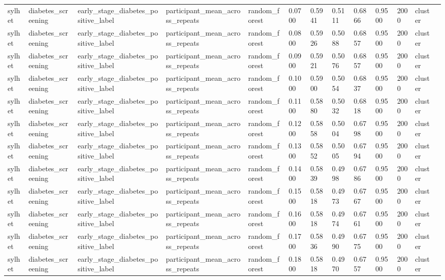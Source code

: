\begin{tabular}{lllllllllllll}
sylhet & diabetes\_screening & early\_stage\_diabetes\_positive\_label & participant\_mean\_across\_repeats & random\_forest & 0.0700 & 0.5941 & 0.5111 & 0.6866 & 0.9500 & 2000 & cluster &  \\
sylhet & diabetes\_screening & early\_stage\_diabetes\_positive\_label & participant\_mean\_across\_repeats & random\_forest & 0.0800 & 0.5926 & 0.5088 & 0.6857 & 0.9500 & 2000 & cluster &  \\
sylhet & diabetes\_screening & early\_stage\_diabetes\_positive\_label & participant\_mean\_across\_repeats & random\_forest & 0.0900 & 0.5921 & 0.5076 & 0.6857 & 0.9500 & 2000 & cluster &  \\
sylhet & diabetes\_screening & early\_stage\_diabetes\_positive\_label & participant\_mean\_across\_repeats & random\_forest & 0.1000 & 0.5900 & 0.5054 & 0.6837 & 0.9500 & 2000 & cluster &  \\
sylhet & diabetes\_screening & early\_stage\_diabetes\_positive\_label & participant\_mean\_across\_repeats & random\_forest & 0.1100 & 0.5880 & 0.5032 & 0.6818 & 0.9500 & 2000 & cluster &  \\
sylhet & diabetes\_screening & early\_stage\_diabetes\_positive\_label & participant\_mean\_across\_repeats & random\_forest & 0.1200 & 0.5858 & 0.5004 & 0.6798 & 0.9500 & 2000 & cluster &  \\
sylhet & diabetes\_screening & early\_stage\_diabetes\_positive\_label & participant\_mean\_across\_repeats & random\_forest & 0.1300 & 0.5852 & 0.5005 & 0.6794 & 0.9500 & 2000 & cluster &  \\
sylhet & diabetes\_screening & early\_stage\_diabetes\_positive\_label & participant\_mean\_across\_repeats & random\_forest & 0.1400 & 0.5839 & 0.4998 & 0.6786 & 0.9500 & 2000 & cluster &  \\
sylhet & diabetes\_screening & early\_stage\_diabetes\_positive\_label & participant\_mean\_across\_repeats & random\_forest & 0.1500 & 0.5818 & 0.4973 & 0.6767 & 0.9500 & 2000 & cluster &  \\
sylhet & diabetes\_screening & early\_stage\_diabetes\_positive\_label & participant\_mean\_across\_repeats & random\_forest & 0.1600 & 0.5818 & 0.4974 & 0.6761 & 0.9500 & 2000 & cluster &  \\
sylhet & diabetes\_screening & early\_stage\_diabetes\_positive\_label & participant\_mean\_across\_repeats & random\_forest & 0.1700 & 0.5836 & 0.4990 & 0.6775 & 0.9500 & 2000 & cluster &  \\
sylhet & diabetes\_screening & early\_stage\_diabetes\_positive\_label & participant\_mean\_across\_repeats & random\_forest & 0.1800 & 0.5818 & 0.4970 & 0.6757 & 0.9500 & 2000 & cluster &  \\

\end{tabular}
